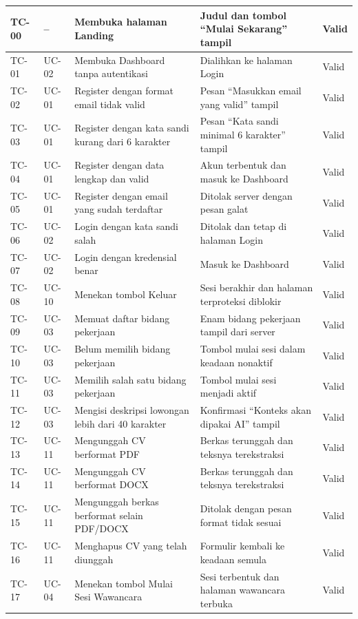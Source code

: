 \documentclass[12pt,a4paper,oneside]{report}
\begin{document}
\begin{longtable}{|C{1.1cm}|C{1.1cm}|L{4.5cm}|L{3.1cm}|C{1.3cm}|}
TC-00 & -- & Membuka halaman Landing & Judul dan tombol ``Mulai Sekarang'' tampil & Valid \\
\hline
TC-01 & UC-02 & Membuka Dashboard tanpa autentikasi & Dialihkan ke halaman Login & Valid \\
\hline
TC-02 & UC-01 & Register dengan format email tidak valid & Pesan ``Masukkan email yang valid'' tampil & Valid \\
\hline
TC-03 & UC-01 & Register dengan kata sandi kurang dari 6 karakter & Pesan ``Kata sandi minimal 6 karakter'' tampil & Valid \\
\hline
TC-04 & UC-01 & Register dengan data lengkap dan valid & Akun terbentuk dan masuk ke Dashboard & Valid \\
\hline
TC-05 & UC-01 & Register dengan email yang sudah terdaftar & Ditolak server dengan pesan galat & Valid \\
\hline
TC-06 & UC-02 & Login dengan kata sandi salah & Ditolak dan tetap di halaman Login & Valid \\
\hline
TC-07 & UC-02 & Login dengan kredensial benar & Masuk ke Dashboard & Valid \\
\hline
TC-08 & UC-10 & Menekan tombol Keluar & Sesi berakhir dan halaman terproteksi diblokir & Valid \\
\hline
TC-09 & UC-03 & Memuat daftar bidang pekerjaan & Enam bidang pekerjaan tampil dari server & Valid \\
\hline
TC-10 & UC-03 & Belum memilih bidang pekerjaan & Tombol mulai sesi dalam keadaan nonaktif & Valid \\
\hline
TC-11 & UC-03 & Memilih salah satu bidang pekerjaan & Tombol mulai sesi menjadi aktif & Valid \\
\hline
TC-12 & UC-03 & Mengisi deskripsi lowongan lebih dari 40 karakter & Konfirmasi ``Konteks akan dipakai AI'' tampil & Valid \\
\hline
TC-13 & UC-11 & Mengunggah CV berformat PDF & Berkas terunggah dan teksnya terekstraksi & Valid \\
\hline
TC-14 & UC-11 & Mengunggah CV berformat DOCX & Berkas terunggah dan teksnya terekstraksi & Valid \\
\hline
TC-15 & UC-11 & Mengunggah berkas berformat selain PDF/DOCX & Ditolak dengan pesan format tidak sesuai & Valid \\
\hline
TC-16 & UC-11 & Menghapus CV yang telah diunggah & Formulir kembali ke keadaan semula & Valid \\
\hline
TC-17 & UC-04 & Menekan tombol Mulai Sesi Wawancara & Sesi terbentuk dan halaman wawancara terbuka & Valid \\

\end{longtable}
\end{document}
